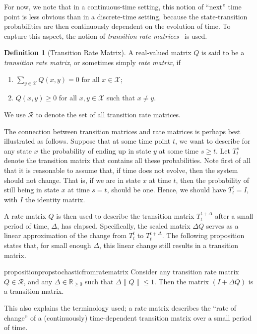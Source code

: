 \documentclass[10pt,a4paper]{paper}
\theoremstyle{definition}
\newtheorem{definition}{Definition}
\newcommand{\reals}{\mathbb{R}}
\newcommand{\realsnonneg}{\reals_{\geq 0}}
\newcommand{\states}{\mathcal{X}}
\newcommand{\norm}[1]{\left\lVert #1 \right\rVert}
\begin{document}
For now, we note that in a continuous-time setting, this notion of ``next'' time point is less obvious than in a discrete-time setting, because the state-transition probabilities are then continuously dependent on the evolution of time. To capture this aspect, the notion of \emph{transition rate matrices}~\cite{norris1998markov} is used.
\begin{definition}[Transition Rate Matrix]\label{def:rate_matrix}
A real-valued matrix $Q$ is said to be a \emph{transition rate matrix}, or sometimes simply \emph{rate matrix}, if

\vspace{5pt}
\begin{enumerate}[label=R\arabic*:,ref=R\arabic*]
\item\label{def:Q:sumzero}
$\sum_{y\in\states}Q(x,y)=0$ for all $x\in\states$;
\item\label{def:Q:nonnegoffdiagonal}
$Q(x,y)\geq0$ for all $x,y\in\states$ such that $x\neq y$.
\end{enumerate}
\noindent
We use $\mathcal{R}$ to denote the set of all transition rate matrices. 
\vspace{5pt}
\end{definition}

The connection between transition matrices and rate matrices is perhaps best illustrated as follows. Suppose that at some time point $t$, we want to describe for any state $x$ the probability of ending up in state $y$ at some time $s\geq t$. Let $T_t^s$ denote the transition matrix that contains all these probabilities. Note first of all that it is reasonable to assume that, if time does not evolve, then the system should not change. That is, if we are in state $x$ at time $t$, then the probability of still being in state $x$ at time $s=t$, should be one. Hence, we should have $T_t^t=I$, with $I$ the identity matrix. 

A rate matrix $Q$ is then used to describe the transition matrix $T_t^{t+\Delta}$ after a small period of time, $\Delta$, has elapsed. Specifically, the scaled matrix $\Delta Q$ serves as a linear approximation of the change from $T_t^t$ to $T_t^{t+\Delta}$. The following proposition states that, for small enough $\Delta$, this linear change still results in a transition matrix.

\begin{restatable}{proposition}{propstochasticfromratematrix}
\label{prop:stochastic_from_rate_matrix}
Consider any transition rate matrix $Q\in\mathcal{R}$, and any $\Delta\in\realsnonneg$ such that $\Delta \norm{Q}\leq 1$. Then the matrix $(I+\Delta Q)$ is a transition matrix.
\end{restatable}
This also explains the terminology used; a rate matrix describes the ``rate of change'' of a (continuously) time-dependent transition matrix over a small period of time.
\end{document}
